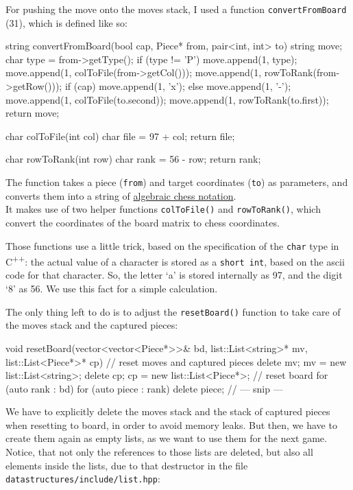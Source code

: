 For pushing the move onto the moves stack, I used a function \texttt{convertFromBoard} (31),
which is defined like so:

\begin{cpp}
string convertFromBoard(bool cap, Piece* from, pair<int, int> to) {
  string move;
  char type = from->getType();
  if (type != 'P') {
    move.append(1, type);
  }
  move.append(1, colToFile(from->getCol()));
  move.append(1, rowToRank(from->getRow()));
  if (cap) {
    move.append(1, 'x');
  } else {
    move.append(1, '-');
  }
  move.append(1, colToFile(to.second));
  move.append(1, rowToRank(to.first));
  return move;
}

char colToFile(int col) {
  char file = 97 + col;
  return file;
}

char rowToRank(int row) {
  char rank = 56 - row;
  return rank;
}
\end{cpp}

The function takes a piece (\texttt{from}) and target coordinates (\texttt{to}) as parameters,
and converts them into a string of
\href{https://en.wikipedia.org/wiki/Algebraic_notation_(chess)}{algebraic chess notation}.\\
It makes use of two helper functions \texttt{colToFile()} and \texttt{rowToRank()},
which convert the coordinates of the board matrix to chess coordinates.

Those functions use a little trick, based on the specification of the \texttt{char} type in
C\textsuperscript{++}: the actual value of a character is stored as a \texttt{short int},
based on the ascii code for that character.
So, the letter `a' is stored internally as 97, and the digit `8' as 56. We use this fact for a
simple calculation.

The only thing left to do is to adjust the \texttt{resetBoard()} function to take care of
the moves stack and the captured pieces:

\begin{cpp}
void resetBoard(vector<vector<Piece*>>& bd,
                 list::List<string>* mv,
                 list::List<Piece*>* cp)
{
  // reset moves and captured pieces
  delete mv;
  mv = new list::List<string>;
  delete cp;
  cp = new list::List<Piece*>;
  // reset board
  for (auto rank : bd) {
    for (auto piece : rank) {
      delete piece;
    }
  }
  // --- snip ---
}
\end{cpp}

We have to explicitly delete the moves stack and the stack of captured pieces when resetting to board,
in order to avoid memory leaks.
But then, we have to create them again as empty lists, as we want to use them for the next game.
Notice, that not only the references to those lists are deleted, but also all elements inside the lists,
due to that destructor in the file \texttt{datastructures/include/list.hpp}:

